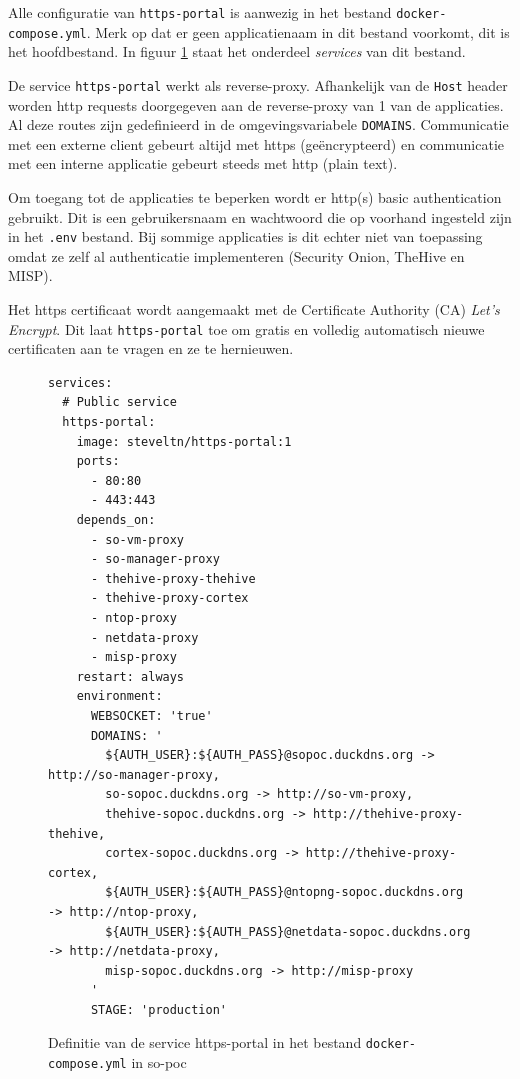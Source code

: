 \documentclass[a4paper,12pt]{report}
\begin{document}
Alle configuratie van \lstinline|https-portal| is aanwezig in het bestand \lstinline|docker-compose.yml|.
Merk op dat er geen applicatienaam in dit bestand voorkomt, dit is het hoofdbestand.
In figuur \ref{fig:https-portal-compose} staat het onderdeel \emph{services} van dit bestand.

De service \lstinline|https-portal| werkt als reverse-proxy.
Afhankelijk van de \lstinline|Host| header worden http requests doorgegeven aan de reverse-proxy van 1 van de applicaties.
Al deze routes zijn gedefinieerd in de omgevingsvariabele \lstinline|DOMAINS|.
Communicatie met een externe client gebeurt altijd met https (geëncrypteerd) en communicatie met een interne applicatie gebeurt steeds met http (plain text).

Om toegang tot de applicaties te beperken wordt er http(s) basic authentication gebruikt.
Dit is een gebruikersnaam en wachtwoord die op voorhand ingesteld zijn in het \lstinline|.env| bestand.
Bij sommige applicaties is dit echter niet van toepassing omdat ze zelf al authenticatie implementeren (Security Onion, TheHive en MISP).

Het https certificaat wordt aangemaakt met de Certificate Authority (CA) \emph{Let's Encrypt}.
Dit laat \lstinline|https-portal| toe om gratis en volledig automatisch nieuwe certificaten aan te vragen en ze te hernieuwen.

\begin{figure}[H]
  \begin{lstlisting}
services:
  # Public service
  https-portal:
    image: steveltn/https-portal:1
    ports:
      - 80:80
      - 443:443
    depends_on:
      - so-vm-proxy
      - so-manager-proxy
      - thehive-proxy-thehive
      - thehive-proxy-cortex
      - ntop-proxy
      - netdata-proxy
      - misp-proxy
    restart: always
    environment:
      WEBSOCKET: 'true'
      DOMAINS: '
        ${AUTH_USER}:${AUTH_PASS}@sopoc.duckdns.org -> http://so-manager-proxy,
        so-sopoc.duckdns.org -> http://so-vm-proxy,
        thehive-sopoc.duckdns.org -> http://thehive-proxy-thehive,
        cortex-sopoc.duckdns.org -> http://thehive-proxy-cortex,
        ${AUTH_USER}:${AUTH_PASS}@ntopng-sopoc.duckdns.org -> http://ntop-proxy,
        ${AUTH_USER}:${AUTH_PASS}@netdata-sopoc.duckdns.org -> http://netdata-proxy,
        misp-sopoc.duckdns.org -> http://misp-proxy
      '
      STAGE: 'production'
  \end{lstlisting}
  \caption{Definitie van de service https-portal in het bestand \lstinline|docker-compose.yml| in so-poc}
  \label{fig:https-portal-compose}
\end{figure}
\end{document}
